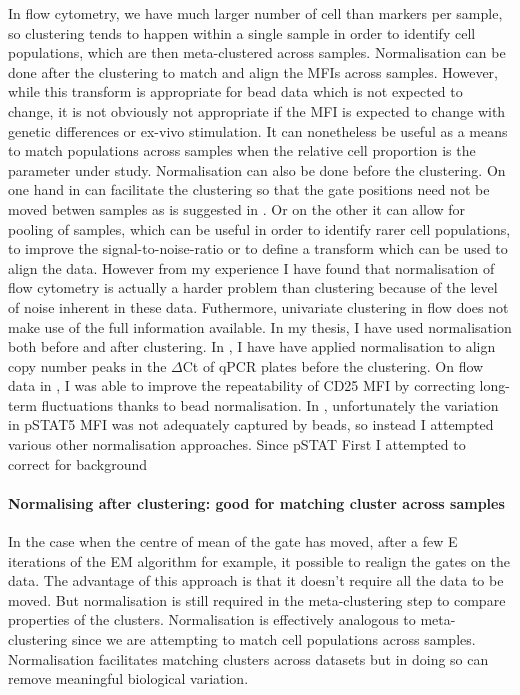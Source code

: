 In flow cytometry, we have much larger number of cell than markers per sample,
so clustering tends to happen within a single sample in order to identify cell populations,
which are then meta-clustered across samples.
Normalisation can be done after the clustering to match and align the MFIs across samples.
However, while this transform is appropriate for bead data which is not expected to change,
it is not obviously not appropriate if the MFI is expected to change with genetic differences or ex-vivo stimulation.
It can nonetheless be useful as a means to match populations across samples when the relative cell proportion is the parameter
under study.
Normalisation can also be done before the clustering.
On one hand in can facilitate the clustering so that the gate positions need not be moved betwen samples as is suggested
in \citet{Hahne:2009hl}.
Or on the other it can allow for pooling of samples, which can be useful in order to identify rarer cell populations,
to improve the signal-to-noise-ratio or to define a transform which can be used to align the data.
However from my experience I have found that normalisation of flow cytometry is actually a harder problem than clustering because of the level of noise inherent in these data.
Futhermore, univariate clustering in flow does not make use of the full information available. 
In my thesis, I have used normalisation both before and after clustering.
In , I have have applied normalisation to align copy number peaks in the $\Delta$Ct of qPCR plates before the clustering.
On flow data in , I was able to improve the repeatability of CD25 MFI by correcting long-term
fluctuations thanks to bead normalisation.
In , unfortunately the variation in pSTAT5 MFI was not adequately captured by beads,
so instead I attempted various other normalisation approaches.
Since pSTAT
First I attempted to correct for background 


\paragraph{Normalising after clustering: good for matching cluster across samples}

In the case when the centre of mean of the gate has moved, after a few E iterations of the EM algorithm for example, it possible to realign the gates on the data.
The advantage of this approach is that it doesn’t require all the data to be moved.
But normalisation is still required in the meta-clustering step to compare properties of the clusters.
Normalisation is effectively analogous to meta-clustering since we are attempting to match cell populations across samples.  
Normalisation facilitates matching clusters across datasets but in doing so can remove meaningful biological variation.  

